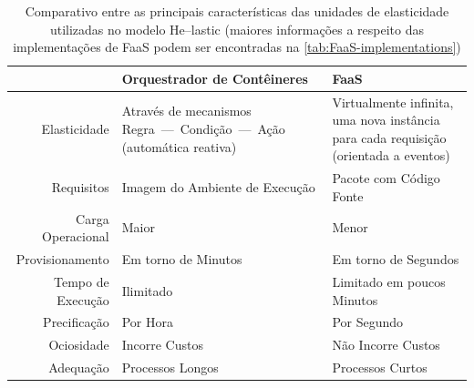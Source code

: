 \documentclass[english,brazilian]{UNISINOSmonografia} %
\newcommand\defaultFigureWidth{0.9}
\renewcommand{\arraystretch}{1.3}
\begin{document}
\begin{table}[tb]
\centering%
\begin{minipage}{\defaultFigureWidth\textwidth}
	\caption[Comparativo entre as principais características das unidades de elasticidade utilizadas no modelo \textsf{He}--lastic]{Comparativo entre as principais características das unidades de elasticidade utilizadas no modelo \textsf{He}--lastic (maiores informações a respeito das implementações de FaaS podem ser encontradas na \autoref{tab:FaaS-implementations})}
	\label{tab:modelo-elasticidade-comparacao}
	\small
	\vspace{1ex}
	\renewcommand\arraystretch{1.4}
	\renewcommand {\tabularxcolumn}[1]{>{\arraybackslash}m{#1}} %
	\begin{tabularx}{\textwidth}{@{}rXX}
		\toprule
		& Orquestrador de Contêineres & FaaS \\ 
		\midrule
		Elasticidade & Através de mecanismos \newline Regra~---~Condição~---~Ação \newline (automática reativa) & Virtualmente infinita, uma nova instância para cada requisição \newline (orientada a eventos) \\
		Requisitos & Imagem do Ambiente \newline de Execução & Pacote com Código Fonte \\
		Carga Operacional & Maior & Menor \\
		Provisionamento & Em torno de Minutos & Em torno de Segundos \\
		Tempo de Execução & Ilimitado & Limitado em poucos Minutos \\
		Precificação & Por Hora & Por Segundo \\
		Ociosidade & Incorre Custos & Não Incorre Custos \\
		Adequação & Processos Longos & Processos Curtos \\ 
		\bottomrule
	\end{tabularx}
\end{minipage}
\end{table}
\end{document}
